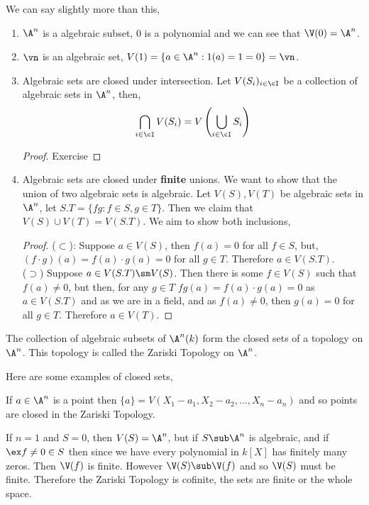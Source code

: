 We can say slightly more than this,
\begin{remark}
 \begin{enumerate}
   \item $\A^n$ is a algebraic subset, $0$ is a polynomial and we can see that $\V(0) = \A^n$.
   \item $\vn$ is an algebraic set, $V(1) = \{a \in \A^n : 1(a) = 1 = 0\} = \vn$.
   \item Algebraic sets are closed under intersection. Let $V(S_i)_{i \in \cI}$ be a collection of algebraic sets in $\A^n$, then,
   $$ \bigcap_{i \in \cI} V(S_i) = V\left(\bigcup_{i \in \cI} S_i \right) $$
   \begin{proof}Exercise
   \end{proof}
   \item Algebraic sets are closed under \textbf{finite} unions. We want to show that the union of two algebraic sets is algebraic. Let $V(S), V(T)$ be algebraic sets in $\A^n$, let $S.T = \{fg : f \in S, g \in T\}$. Then we claim that $V(S) \cup V(T) = V(S.T)$. We aim to show both inclusions,\\
   \begin{proof}
     ($\subset$): Suppose $a \in V(S)$, then $f(a) = 0$ for all $f \in S$, but, $(f \cdot g) (a) = f(a) \cdot g(a) = 0$ for all $g \in T$. Therefore $a \in V(S.T)$.\\
     ($\supset$) Suppose $a \in V(S.T) \sm V(S)$. Then there is some $f \in V(S)$ such that $f(a)\ne 0$, but then, for any $g \in T$ $fg(a) = f(a) \cdot g(a) = 0$ as $a \in V(S.T)$ and as we are in a field, and as $f(a) \ne 0$, then $g(a) = 0$ for all $g \in T$. Therefore $a \in V(T)$.
   \end{proof}
 \end{enumerate}
\end{remark}

\begin{nprop}
    The collection of algebraic subsets of $\A^n(k)$ form the closed sets of a topology on $\A^n$. This topology is called the Zariski Topology on $\A^n$.
\end{nprop}

Here are some examples of closed sets,
\begin{eg}
  If $a \in \A^n$ is a point then $\{a\} = V(X_1 - a_1, X_2 - a_2, \dots, X_n - a_n)$ and so points are closed in the Zariski Topology.
\end{eg}

\begin{eg}
  If $n = 1$ and $S = 0$, then $V(S) = \A^n$, but if $S \sub \A^n$ is algebraic, and if $\ex f \ne 0 \in S$ then since we have every polynomial in $k[X]$ has finitely many zeros. Then $\V(f)$ is finite. However $\V(S) \sub \V(f)$ and so $\V(S)$ must be finite. Therefore the Zariski Topology is cofinite, the sets are finite or the whole space.
\end{eg}
